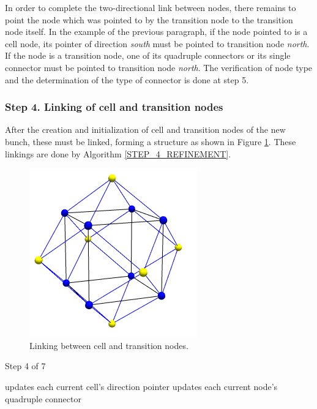 In order to complete the two-directional link between nodes, there
remains to point the node which was pointed to by the transition
node to the transition node itself. In the example of the previous
paragraph, if the node pointed to is a cell node, its pointer of
direction \textit{south} must be pointed to transition node
\textit{north}. If the node is a transition node, one of its
quadruple connectors or its single connector must be pointed to
transition node \textit{north}. The verification of node type and
the determination of the type of connector is done at step 5.


\subsubsection*{Step 4. Linking of cell and transition nodes}
After the creation and initialization of cell and transition nodes
of the new bunch, these must be linked, forming a structure as shown
in Figure \ref{FIG_BUNCH}.  These linkings are done by Algorithm
\ref{STEP_4_REFINEMENT}.

\begin{figure}[ht]
    \centering
    \includegraphics[scale=0.35]{../img/bunch.jpg}
    \caption{Linking between cell and transition nodes.}
    \label{FIG_BUNCH}
\end{figure}

\begin{algorithm}[h]
    \caption{Step 4 of 7}
    \small{
    \begin{algorithmic}[1]
            \State updates each current cell's direction pointer
        \EndFor
        \State
            \State updates each current node's quadruple connector
        \EndFor
    \end{algorithmic}
    }
    \label{STEP_4_REFINEMENT}
\end{algorithm}

